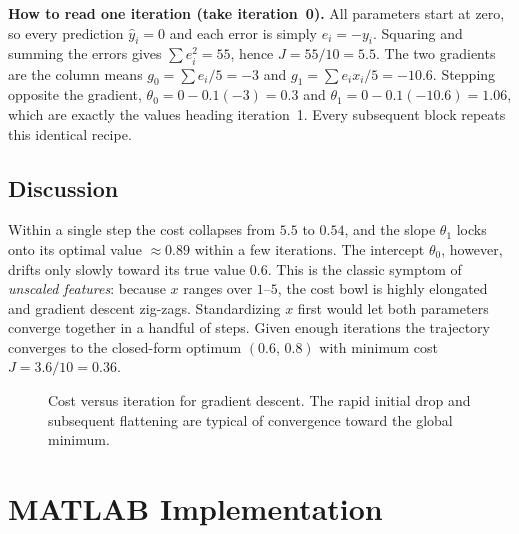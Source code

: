 \documentclass[11pt,a4paper]{report}
\theoremstyle{definition}
\theoremstyle{plain}
\theoremstyle{remark}
\begin{document}
	\noindent\textbf{How to read one iteration (take iteration~0).}
	All parameters start at zero, so every prediction $\hat y_i=0$ and each error
	is simply $e_i=-y_i$. Squaring and summing the errors gives
	$\sum e_i^2=55$, hence $J=55/10=5.5$. The two gradients are the column means
	$g_0=\sum e_i/5=-3$ and $g_1=\sum e_i x_i/5=-10.6$. Stepping opposite the
	gradient, $\theta_0=0-0.1(-3)=0.3$ and $\theta_1=0-0.1(-10.6)=1.06$, which are
	exactly the values heading iteration~1. Every subsequent block repeats this
	identical recipe.
	
	\section{Discussion}
	Within a single step the cost collapses from $5.5$ to $0.54$, and the slope
	$\theta_1$ locks onto its optimal value $\approx0.89$ within a few iterations.
	The intercept $\theta_0$, however, drifts only slowly toward its true value
	$0.6$. This is the classic symptom of \emph{unscaled features}: because $x$
	ranges over $1$--$5$, the cost bowl is highly elongated and gradient descent
	zig-zags. Standardizing $x$ first would let both parameters converge together
	in a handful of steps. Given enough iterations the trajectory converges to the
	closed-form optimum $(0.6,\,0.8)$ with minimum cost $J=3.6/10=0.36$.
	
	\begin{figure}[ht]
		\centering
		\caption{Cost versus iteration for gradient descent. The rapid initial drop and
			subsequent flattening are typical of convergence toward the global minimum.}
		\label{fig:costiter}
	\end{figure}
	
	\chapter{MATLAB Implementation}
	
\end{document}
